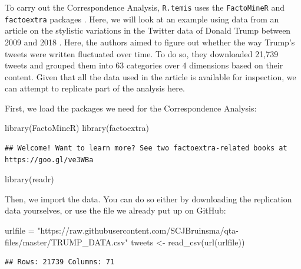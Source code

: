 \documentclass[
]{article}
\newenvironment{Shaded}{\begin{snugshade}}{\end{snugshade}}
\newcommand{\FunctionTok}[1]{\textcolor[rgb]{0.00,0.00,0.00}{#1}}
\newcommand{\NormalTok}[1]{#1}
\newcommand{\OtherTok}[1]{\textcolor[rgb]{0.56,0.35,0.01}{#1}}
\newcommand{\StringTok}[1]{\textcolor[rgb]{0.31,0.60,0.02}{#1}}
\begin{document}
To carry out the Correspondence Analysis, \texttt{R.temis} uses the \texttt{FactoMineR} and \texttt{factoextra} packages \autocite{Le2008a}. Here, we will look at an example using data from an article on the stylistic variations in the Twitter data of Donald Trump between 2009 and 2018 \autocite{Clarke2019a}. Here, the authors aimed to figure out whether the way Trump's tweets were written fluctuated over time. To do so, they downloaded 21,739 tweets and grouped them into 63 categories over 4 dimensions based on their content. Given that all the data used in the article is available for inspection, we can attempt to replicate part of the analysis here.

First, we load the packages we need for the Correspondence Analysis:

\begin{Shaded}
\begin{Highlighting}[]
\FunctionTok{library}\NormalTok{(FactoMineR)}
\FunctionTok{library}\NormalTok{(factoextra)}
\end{Highlighting}
\end{Shaded}

\begin{verbatim}
## Welcome! Want to learn more? See two factoextra-related books at https://goo.gl/ve3WBa
\end{verbatim}

\begin{Shaded}
\begin{Highlighting}[]
\FunctionTok{library}\NormalTok{(readr)}
\end{Highlighting}
\end{Shaded}

Then, we import the data. You can do so either by downloading the replication data yourselves, or use the file we already put up on GitHub:

\begin{Shaded}
\begin{Highlighting}[]
\NormalTok{urlfile }\OtherTok{=} \StringTok{"https://raw.githubusercontent.com/SCJBruinsma/qta{-}files/master/TRUMP\_DATA.csv"}
\NormalTok{tweets }\OtherTok{\textless{}{-}} \FunctionTok{read\_csv}\NormalTok{(}\FunctionTok{url}\NormalTok{(urlfile))}
\end{Highlighting}
\end{Shaded}

\begin{verbatim}
## Rows: 21739 Columns: 71
\end{verbatim}
\end{document}

